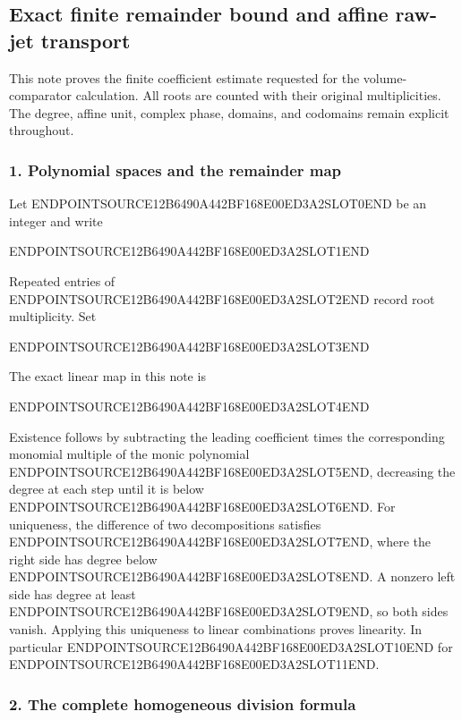 \subsection{Exact finite remainder bound and affine raw-jet transport}\label{endpoint-relation_balance_original--exact-finite-remainder-bound-and-affine-raw-jet-transport}

This note proves the finite coefficient estimate requested for the volume-comparator calculation. All roots are counted with their original multiplicities. The degree, affine unit, complex phase, domains, and codomains remain explicit throughout.

\subsubsection{1. Polynomial spaces and the remainder map}\label{endpoint-relation_balance_original--polynomial-spaces-and-the-remainder-map}

Let ENDPOINTSOURCE12B6490A442BF168E00ED3A2SLOT0END be an integer and write

ENDPOINTSOURCE12B6490A442BF168E00ED3A2SLOT1END

Repeated entries of ENDPOINTSOURCE12B6490A442BF168E00ED3A2SLOT2END record root multiplicity. Set

ENDPOINTSOURCE12B6490A442BF168E00ED3A2SLOT3END

The exact linear map in this note is

ENDPOINTSOURCE12B6490A442BF168E00ED3A2SLOT4END

Existence follows by subtracting the leading coefficient times the corresponding monomial multiple of the monic polynomial ENDPOINTSOURCE12B6490A442BF168E00ED3A2SLOT5END, decreasing the degree at each step until it is below ENDPOINTSOURCE12B6490A442BF168E00ED3A2SLOT6END. For uniqueness, the difference of two decompositions satisfies ENDPOINTSOURCE12B6490A442BF168E00ED3A2SLOT7END, where the right side has degree below ENDPOINTSOURCE12B6490A442BF168E00ED3A2SLOT8END. A nonzero left side has degree at least ENDPOINTSOURCE12B6490A442BF168E00ED3A2SLOT9END, so both sides vanish. Applying this uniqueness to linear combinations proves linearity. In particular ENDPOINTSOURCE12B6490A442BF168E00ED3A2SLOT10END for ENDPOINTSOURCE12B6490A442BF168E00ED3A2SLOT11END.

\subsubsection{2. The complete homogeneous division formula}\label{endpoint-relation_balance_original--the-complete-homogeneous-division-formula}

